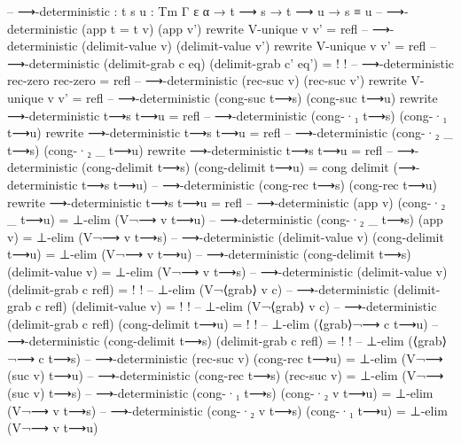 \begin{code}[hide]
-- ⟶-deterministic : {t s u : Tm Γ ε α} → t ⟶ s → t ⟶ u → s ≡ u
-- ⟶-deterministic (app {t = t} v) (app v') rewrite V-unique v v' = refl
-- ⟶-deterministic (delimit-value v) (delimit-value v') rewrite V-unique v v' = refl
-- ⟶-deterministic (delimit-grab c eq) (delimit-grab c' eq') = {!   !}
-- ⟶-deterministic rec-zero rec-zero = refl
-- ⟶-deterministic (rec-suc v) (rec-suc v') rewrite V-unique v v' = refl
-- ⟶-deterministic (cong-suc t⟶s) (cong-suc t⟶u) rewrite ⟶-deterministic t⟶s t⟶u = refl
-- ⟶-deterministic (cong-·₁ t⟶s) (cong-·₁ t⟶u) rewrite ⟶-deterministic t⟶s t⟶u = refl
-- ⟶-deterministic (cong-·₂ _ t⟶s) (cong-·₂ _ t⟶u) rewrite ⟶-deterministic t⟶s t⟶u = refl
-- ⟶-deterministic (cong-delimit t⟶s) (cong-delimit t⟶u) = cong delimit (⟶-deterministic t⟶s t⟶u)
-- ⟶-deterministic (cong-rec t⟶s) (cong-rec t⟶u) rewrite ⟶-deterministic t⟶s t⟶u = refl
-- ⟶-deterministic (app v) (cong-·₂ _ t⟶u) = ⊥-elim (V¬⟶ v t⟶u)
-- ⟶-deterministic (cong-·₂ _ t⟶s) (app v) = ⊥-elim (V¬⟶ v t⟶s)
-- ⟶-deterministic (delimit-value v) (cong-delimit t⟶u) = ⊥-elim (V¬⟶ v t⟶u)
-- ⟶-deterministic (cong-delimit t⟶s) (delimit-value v) = ⊥-elim (V¬⟶ v t⟶s)
-- ⟶-deterministic (delimit-value v) (delimit-grab c refl) = {!   !} -- ⊥-elim (V¬⟨grab⟩ v c)
-- ⟶-deterministic (delimit-grab c refl) (delimit-value v) = {!   !} -- ⊥-elim (V¬⟨grab⟩ v c)
-- ⟶-deterministic (delimit-grab c refl) (cong-delimit t⟶u) = {!   !} -- ⊥-elim (⟨grab⟩¬⟶ c t⟶u)
-- ⟶-deterministic (cong-delimit t⟶s) (delimit-grab c refl) = {!   !} -- ⊥-elim (⟨grab⟩¬⟶ c t⟶s)
-- ⟶-deterministic (rec-suc v) (cong-rec t⟶u) = ⊥-elim (V¬⟶ (suc v) t⟶u)
-- ⟶-deterministic (cong-rec t⟶s) (rec-suc v) = ⊥-elim (V¬⟶ (suc v) t⟶s)
-- ⟶-deterministic (cong-·₁ t⟶s) (cong-·₂ v t⟶u) = ⊥-elim (V¬⟶ v t⟶s)
-- ⟶-deterministic (cong-·₂ v t⟶s) (cong-·₁ t⟶u) = ⊥-elim (V¬⟶ v t⟶u)
\end{code}
